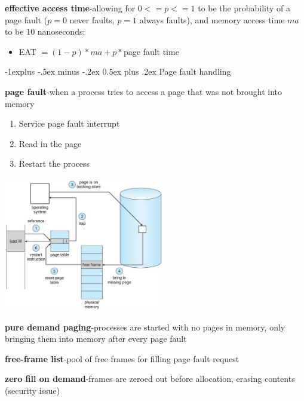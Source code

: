 \documentclass[8pt,landscape]{article}
\makeatletter
\renewcommand{\subsection}{\@startsection{subsection}{2}{0mm}%
                                {-1explus -.5ex minus -.2ex}%
                                {0.5ex plus .2ex}%
                                {\normalfont\scriptsize\bfseries}}
\makeatother
\begin{document}
\begin{multicols}{3}
\begin{tiny}
	\textbf{effective access time}-allowing for $0<=p<=1$ to be the probability of a page fault
	($p=0$ never faults, $p=1$ always faults), and memory access time $ma$ to be $10$ nanoseconds;
	\begin{itemize}[noitemsep]
		\item EAT $= (1-p)*ma+p*$page fault time
	\end{itemize}

	\subsection{Page fault handling}

	\textbf{page fault}-when a process tries to access a page that was not brought into memory
	\begin{enumerate}[noitemsep]
		\item Service page fault interrupt
		\item Read in the page
		\item Restart the process
	\end{enumerate}
	
	\begingroup
		\centering
		\includegraphics[width=7cm]{pageFault.png}
	\endgroup
	
	\textbf{pure demand paging}-processes are started with no pages in memory, only bringing them
	into memory after every page fault

	\textbf{free-frame list}-pool of free frames for filling page fault request

	\textbf{zero fill on demand}-frames are zeroed out before allocation, erasing contents
	(security issue)


\end{tiny}
\end{multicols}
\end{document}
